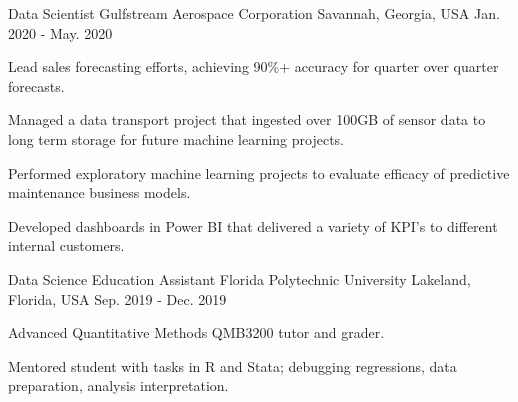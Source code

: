 

\begin{cventries}

  \cventry
    {Data Scientist} %
    {Gulfstream Aerospace Corporation} %
    {Savannah, Georgia, USA} %
    {Jan. 2020 - May. 2020} %
    {
      \begin{cvitems} %
        \item {Lead sales forecasting efforts, achieving 90\%+ accuracy for quarter over quarter forecasts.}
        \item {Managed a data transport project that ingested over 100GB of sensor data to long term storage for future machine learning projects.}
        \item {Performed exploratory machine learning projects to evaluate efficacy of predictive maintenance business models.}
        \item {Developed dashboards in Power BI that delivered a variety of KPI's to different internal customers.}
      \end{cvitems}
    }

  \cventry
    {Data Science Education Assistant} %
    {Florida Polytechnic University} %
    {Lakeland, Florida, USA} %
    {Sep. 2019 - Dec. 2019} %
    {
      \begin{cvitems} %
        \item {Advanced Quantitative Methods QMB3200 tutor and grader.}
        \item {Mentored student with tasks in R and Stata; debugging regressions, data preparation, analysis interpretation.}
      \end{cvitems}
    }


\end{cventries}
